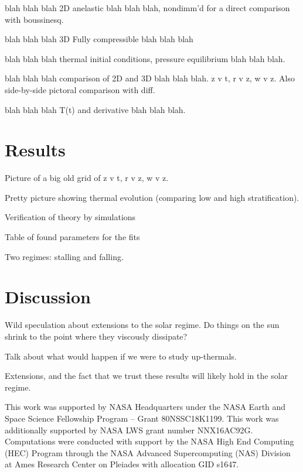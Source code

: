 \documentclass[twocolumn, amsmath, amsfonts, amssymb, trackchanges]{aastex62}
\begin{document}
blah blah blah 2D anelastic blah blah blah, nondimm'd for a direct comparison with
boussinesq.

blah blah blah 3D Fully compressible blah blah blah

blah blah blah thermal initial conditions, pressure equilibrium blah blah blah.

blah blah blah comparison of 2D and 3D blah blah blah. z v t, r v z, w v z. Also side-by-side
pictoral comparison with diff.

blah blah blah T(t) and derivative blah blah blah.

\section{Results}
\label{sec:results}
Picture of a big old grid of z v t, r v z, w v z.

Pretty picture showing thermal evolution (comparing low and high stratification).

Verification of theory by simulations

Table of found parameters for the fits

Two regimes: stalling and falling.


\section{Discussion}
\label{sec:discussion}
Wild speculation about extensions to the solar regime. Do things on the sun shrink
to the point where they viscously dissipate?

Talk about what would happen if we were to study up-thermals.

Extensions, and the fact that we trust these results will likely hold in the solar regime.



\begin{acknowledgements}
This work was supported by NASA Headquarters under the NASA Earth and Space
Science Fellowship Program -- Grant 80NSSC18K1199.
This work was additionally supported by  NASA LWS grant number NNX16AC92G.  
Computations were conducted 
with support by the NASA High End Computing (HEC) Program through the NASA 
Advanced Supercomputing (NAS) Division at Ames Research Center on Pleiades
with allocation GID s1647.
\end{acknowledgements}
\end{document}
